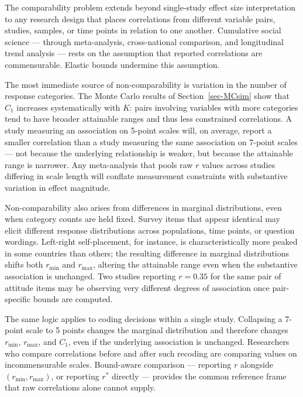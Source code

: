 \documentclass[
  12pt,
]{article}
\theoremstyle{plain}
\theoremstyle{definition}
\theoremstyle{remark}
\begin{document}
The comparability problem extends beyond single-study effect size
interpretation to any research design that places correlations from
different variable pairs, studies, samples, or time points in relation
to one another. Cumulative social science --- through meta-analysis,
cross-national comparison, and longitudinal trend analysis --- rests on
the assumption that reported correlations are commensurable. Elastic
bounds undermine this assumption.

The most immediate source of non-comparability is variation in the
number of response categories. The Monte Carlo results of
Section~\ref{sec-MCsim} show that \(C_1\) increases systematically with
\(K\): pairs involving variables with more categories tend to have
broader attainable ranges and thus less constrained correlations. A
study measuring an association on 5-point scales will, on average,
report a smaller correlation than a study measuring the same association
on 7-point scales --- not because the underlying relationship is weaker,
but because the attainable range is narrower. Any meta-analysis that
pools raw \(r\) values across studies differing in scale length will
conflate measurement constraints with substantive variation in effect
magnitude.

Non-comparability also arises from differences in marginal
distributions, even when category counts are held fixed. Survey items
that appear identical may elicit different response distributions across
populations, time points, or question wordings. Left-right
self-placement, for instance, is characteristically more peaked in some
countries than others; the resulting difference in marginal
distributions shifts both \(r_{\min}\) and \(r_{\max}\), altering the
attainable range even when the substantive association is unchanged. Two
studies reporting \(r = 0.35\) for the same pair of attitude items may
be observing very different degrees of association once pair-specific
bounds are computed.

The same logic applies to coding decisions within a single study.
Collapsing a 7-point scale to 5 points changes the marginal distribution
and therefore changes \(r_{\min}\), \(r_{\max}\), and \(C_1\), even if
the underlying association is unchanged. Researchers who compare
correlations before and after such recoding are comparing values on
incommensurable scales. Bound-aware comparison --- reporting \(r\)
alongside \((r_{\min}, r_{\max})\), or reporting \(r^*\) directly ---
provides the common reference frame that raw correlations alone cannot
supply.
\end{document}

